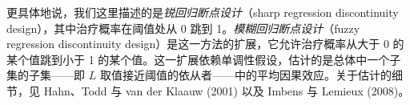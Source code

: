 \begin{finepoint}[回归断点设计]
更具体地说，我们这里描述的是\emph{锐回归断点设计}（sharp regression discontinuity design），其中治疗概率在阈值处从 0 跳到 1。\emph{模糊回归断点设计}（fuzzy regression discontinuity design）是这一方法的扩展，它允许治疗概率从大于 0 的某个值跳到小于 1 的某个值。这一扩展依赖单调性假设，估计的是总体中一个子集的子集——即 $L$ 取值接近阈值的依从者——中的平均因果效应。关于估计的细节，见 Hahn、Todd 与 van der Klaauw (2001) 以及 Imbens 与 Lemieux (2008)。
\end{finepoint}
